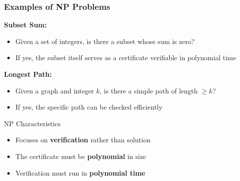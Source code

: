 \begin{frame}
  \frametitle{Examples of NP Problems}
  
  \textbf{Subset Sum:}
  \begin{itemize}
      \item Given a set of integers, is there a subset whose sum is zero?
      \vspace{3pt}
      \item If yes, the subset itself serves as a certificate verifiable in polynomial time
  \end{itemize}
  
  \vspace{0.5cm}
  
  \textbf{Longest Path:}
  \begin{itemize}
      \item Given a graph and integer $k$, is there a simple path of length $\geq k$?
      \vspace{3pt}
      \item If yes, the specific path can be checked efficiently
  \end{itemize}
  
  \vspace{0.5cm}
  
  \begin{block}{NP Characteristics}
      \begin{itemize}
          \item Focuses on \textbf{verification} rather than solution
          \vspace{3pt}
          \item The certificate must be \textbf{polynomial} in size
          \vspace{3pt}
          \item Verification must run in \textbf{polynomial time}
      \end{itemize}
  \end{block}
\end{frame}


